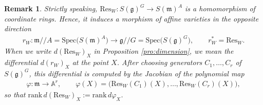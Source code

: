 \documentclass[11pt]{amsart}
\theoremstyle{definition}
\theoremstyle{plain}
\newtheorem{remark}[theorem]{Remark}
\theoremstyle{conclusion}
\begin{document}
\begin{remark}
\label{rem:dResW}
Strictly speaking, $\mathrm{Res}_W:S(\mathfrak{g})^G\to S(\mathfrak{m})^A$ is a homomorphism of coordinate rings. Hence, it induces a morphism of affine varieties in the opposite direction
\begin{align*}
    r_W: \mathfrak{m}//A=\mathrm{Spec}\bigl(S(\mathfrak{m})^A\bigr)\longrightarrow \mathfrak{g}//G=\mathrm{Spec}\bigl(S(\mathfrak{g})^G\bigr),\qquad r_W^*=\mathrm{Res}_W.
\end{align*}
When we write $d(\mathrm{Res}_W)_X$ in Proposition \ref{pro:dimension}, we mean the differential $d(r_W)_X$ at the point $X$. After choosing generators $C_1,\ldots,C_r$ of $S(\mathfrak{g})^G$, this differential is computed by the Jacobian of the polynomial map
\begin{align*}
    \varphi: \mathfrak{m}\to\mathbb{A}^r,\qquad \varphi(X)=\bigl(\mathrm{Res}_W(C_1)(X),\ldots,\mathrm{Res}_W(C_r)(X)\bigr),
\end{align*}
so that $\mathrm{rank}\,d(\mathrm{Res}_W)_X:=\mathrm{rank}\,d\varphi_X$.
\end{remark}
\end{document}
